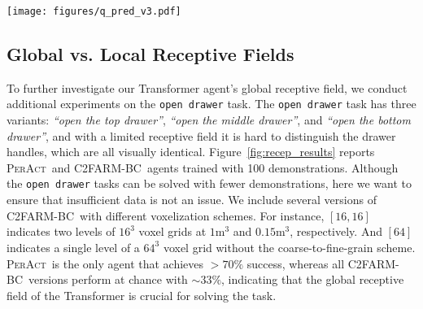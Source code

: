 \documentclass{article}
\newcommand{\appsecref}[1]{Appendix~\ref{#1}}
\newcommand{\figref}[1]{Figure~\ref{#1}}
\newcommand{\unet}{C2FARM-BC~}
\newcommand{\model}{\textsc{PerAct}}
\begin{document}
\begin{figure*}[!t]
    \centering
    \vspace{-1.2cm}
    \hspace*{-1.5cm}
    \texttt{[image: figures/q\_pred\_v3.pdf]}
    \caption{\textbf{Q-Prediction Examples}: Qualitative examples of translation $\mathcal{Q}$-Predictions from \model~along with expert actions, highlighted with dotted-circles. The left two are simulated tasks, and the right two are real-world tasks. See \appsecref{app:more_qpred} for more examples.}
    \label{fig:q_pred} 
    \vspace{-1em}
\end{figure*}


\subsection{Global vs. Local Receptive Fields}
To further investigate our Transformer agent's global receptive field, we conduct additional experiments on the \texttt{open drawer} task. 
The \texttt{open drawer} task has three variants: \textit{``open the top drawer''}, \textit{``open the middle drawer''}, and \textit{``open the bottom drawer''}, and with a limited receptive field it is hard to distinguish the drawer handles, which are all visually identical. 
\figref{fig:recep_results} reports \model~and \unet agents trained with 100 demonstrations. Although the \texttt{open drawer} tasks can be solved with fewer demonstrations, here we want to ensure that insufficient data is not an issue. We include several versions of \unet with different voxelization schemes. For instance, $[16,16]$ indicates two levels of $16^3$ voxel grids at $1\textrm{m}^3$ and $0.15\textrm{m}^3$, respectively. And $[64]$ indicates a single level of a $64^3$ voxel grid without the coarse-to-fine-grain scheme. \model~is the only agent that achieves $>70\%$ success, whereas all \unet versions perform at chance with $\sim 33\%$, indicating that the global receptive field of the Transformer is crucial for solving the task. 
\end{document}

